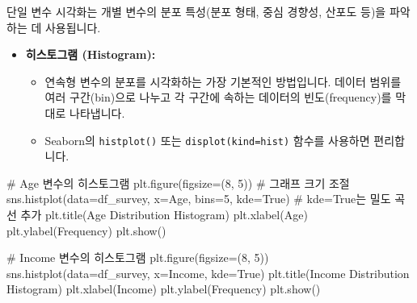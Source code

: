 \documentclass[
  letterpaper,
]{book}
\newenvironment{Shaded}{\begin{snugshade}}{\end{snugshade}}
\newcommand{\CommentTok}[1]{\textcolor[rgb]{0.37,0.37,0.37}{#1}}
\newcommand{\DecValTok}[1]{\textcolor[rgb]{0.68,0.00,0.00}{#1}}
\newcommand{\NormalTok}[1]{\textcolor[rgb]{0.00,0.23,0.31}{#1}}
\newcommand{\OperatorTok}[1]{\textcolor[rgb]{0.37,0.37,0.37}{#1}}
\newcommand{\StringTok}[1]{\textcolor[rgb]{0.13,0.47,0.30}{#1}}
\newcommand{\VariableTok}[1]{\textcolor[rgb]{0.07,0.07,0.07}{#1}}
\providecommand{\tightlist}{%
  \setlength{\itemsep}{0pt}\setlength{\parskip}{0pt}}
\begin{document}
단일 변수 시각화는 개별 변수의 분포 특성(분포 형태, 중심 경향성, 산포도
등)을 파악하는 데 사용됩니다.

\begin{itemize}
\tightlist
\item
  \textbf{히스토그램 (Histogram):}

  \begin{itemize}
  \tightlist
  \item
    연속형 변수의 분포를 시각화하는 가장 기본적인 방법입니다. 데이터
    범위를 여러 구간(bin)으로 나누고 각 구간에 속하는 데이터의
    빈도(frequency)를 막대로 나타냅니다.
  \item
    Seaborn의 \texttt{histplot()} 또는
    \texttt{displot(kind=\textquotesingle{}hist\textquotesingle{})}
    함수를 사용하면 편리합니다.
  \end{itemize}
\end{itemize}

\begin{Shaded}
\begin{Highlighting}[]
\CommentTok{\# Age 변수의 히스토그램}
\NormalTok{plt.figure(figsize}\OperatorTok{=}\NormalTok{(}\DecValTok{8}\NormalTok{, }\DecValTok{5}\NormalTok{)) }\CommentTok{\# 그래프 크기 조절}
\NormalTok{sns.histplot(data}\OperatorTok{=}\NormalTok{df\_survey, x}\OperatorTok{=}\StringTok{\textquotesingle{}Age\textquotesingle{}}\NormalTok{, bins}\OperatorTok{=}\DecValTok{5}\NormalTok{, kde}\OperatorTok{=}\VariableTok{True}\NormalTok{) }\CommentTok{\# kde=True는 밀도 곡선 추가}
\NormalTok{plt.title(}\StringTok{\textquotesingle{}Age Distribution Histogram\textquotesingle{}}\NormalTok{)}
\NormalTok{plt.xlabel(}\StringTok{\textquotesingle{}Age\textquotesingle{}}\NormalTok{)}
\NormalTok{plt.ylabel(}\StringTok{\textquotesingle{}Frequency\textquotesingle{}}\NormalTok{)}
\NormalTok{plt.show()}

\CommentTok{\# Income 변수의 히스토그램}
\NormalTok{plt.figure(figsize}\OperatorTok{=}\NormalTok{(}\DecValTok{8}\NormalTok{, }\DecValTok{5}\NormalTok{))}
\NormalTok{sns.histplot(data}\OperatorTok{=}\NormalTok{df\_survey, x}\OperatorTok{=}\StringTok{\textquotesingle{}Income\textquotesingle{}}\NormalTok{, kde}\OperatorTok{=}\VariableTok{True}\NormalTok{)}
\NormalTok{plt.title(}\StringTok{\textquotesingle{}Income Distribution Histogram\textquotesingle{}}\NormalTok{)}
\NormalTok{plt.xlabel(}\StringTok{\textquotesingle{}Income\textquotesingle{}}\NormalTok{)}
\NormalTok{plt.ylabel(}\StringTok{\textquotesingle{}Frequency\textquotesingle{}}\NormalTok{)}
\NormalTok{plt.show()}
\end{Highlighting}
\end{Shaded}
\end{document}
